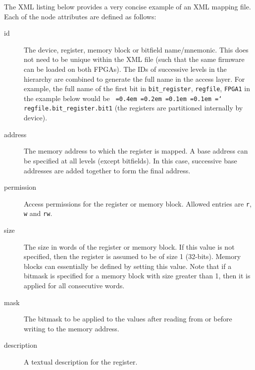 \documentclass[a4paper,11pt]{article}
\newcommand*\justify{
  \fontdimen2\font=0.4em %
  \fontdimen3\font=0.2em %
  \fontdimen4\font=0.1em %
  \fontdimen7\font=0.1em %
  \hyphenchar\font=`\-   %
}
\begin{document}
The XML listing below provides a very concise example of an XML mapping file. 
Each of the node attributes are defined as follows:

\begin{description}
 \item[id] The device, register, memory block or bitfield name/mnemonic. This 
does not need to be unique within the XML file (such that the same firmware can 
be loaded on both FPGAs). The IDs of successive levels in the hierarchy are 
combined to generate the full name in the access layer. For example, the 
full name of the first bit in \texttt{bit\_register}, \texttt{regfile}, 
\texttt{FPGA1} in the example below would be 
\texttt{\justify regfile.bit\_register.bit1} (the registers are partitioned 
internally by device). 

 \item[address] The memory address to which the register is mapped. A base 
address can be specified at all levels (except bitfields). In this case, 
successive base addresses are added together to form the final address. 

 \item[permission] Access permissions for the register or memory block. Allowed 
entries are \texttt{r}, \texttt{w} and \texttt{rw}.

 \item[size] The size in words of the register or memory block. If this value 
is not specified, then the register is assumed to be of size 1 (32-bits). 
Memory blocks can essentially be defined by setting this value. Note that if a 
bitmask is specified for a memory block with size greater than 1, then it is 
applied for all consecutive words.
 
 \item[mask] The bitmask to be applied to the values after reading from or 
before writing to the memory address. 

 \item[description] A textual description for the register.
\end{description}

\end{document}
